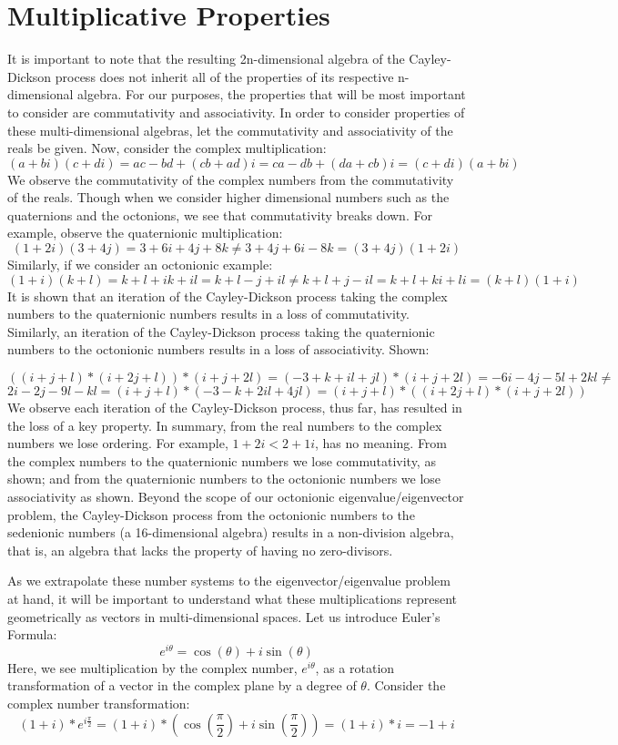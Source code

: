 \documentclass{article}
\theoremstyle{plain}
\begin{document}
\section{Multiplicative Properties}
It is important to note that the resulting 2n-dimensional algebra of the Cayley-Dickson process does not inherit all of the properties of its respective n-dimensional algebra. For our purposes, the properties that will be most important to consider are commutativity and associativity. In order to consider properties of these multi-dimensional algebras, let the commutativity and associativity of the reals be given. Now, consider the complex multiplication:
$$(a+bi)(c+di) = ac-bd+(cb+ad)i = ca-db+(da+cb)i=(c+di)(a+bi)$$
We observe the commutativity of the complex numbers from the commutativity of the reals. Though when we consider higher dimensional numbers such as the quaternions and the octonions, we see that commutativity breaks down. For example, observe the quaternionic multiplication:
$$(1+2i)(3+4j) = 3+6i+4j+8k \neq 3+4j+6i-8k = (3+4j)(1+2i)$$
Similarly, if we consider an octonionic example:
$$(1+i)(k+l) = k+l+ik+il = k+l-j+il \neq k+l+j-il = k+l+ki+li = (k+l)(1+i)$$
It is shown that an iteration of the Cayley-Dickson process taking the complex numbers to the quaternionic numbers results in a loss of commutativity. Similarly, an iteration of the Cayley-Dickson process taking the quaternionic numbers to the octonionic numbers results in a loss of associativity. Shown:

$$((i+j+l)*(i+2j+l))*(i+j+2l) = (-3+k+il+jl)*(i+j+2l) = 
-6i-4j-5l+2kl \neq$$
$$2i-2j-9l-kl = (i+j+l)*(-3-k+2il+4jl) = (i+j+l)*((i+2j+l)*(i+j+2l))$$
We observe each iteration of the Cayley-Dickson process, thus far, has resulted in the loss of a key property. In summary, from the real numbers to the complex numbers we lose ordering. For example, $1+2i<2+1i$, has no meaning. From the complex numbers to the quaternionic numbers we lose commutativity, as shown; and from the quaternionic numbers to the octonionic numbers we lose associativity as shown. Beyond the scope of our octonionic eigenvalue/eigenvector problem, the Cayley-Dickson process from the octonionic numbers to the sedenionic numbers (a 16-dimensional algebra) results in a non-division algebra, that is, an algebra that lacks the property of having no zero-divisors.

As we extrapolate these number systems to the eigenvector/eigenvalue problem at hand, it will be important to understand what these multiplications represent geometrically as vectors in multi-dimensional spaces. Let us introduce Euler's Formula: $$e^{i\theta}=\cos(\theta)+i\sin(\theta)$$ 
Here, we see multiplication by the complex number, $e^{i\theta}$, as a rotation transformation of a vector in the complex plane by a degree of $\theta$. Consider the complex number transformation: 
$$(1+i)*e^{i\frac{\pi}{2}} = (1+i)*(\cos(\frac{\pi}{2})+i\sin(\frac{\pi}{2})) = (1+i)*i = -1 + i$$
\end{document}
